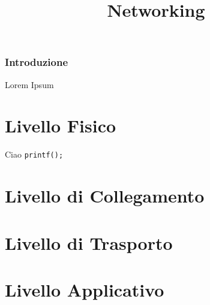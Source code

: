 \documentclass[a4paper,11pt]{paper}
\title{Networking}
\def\code#1{\texttt{#1}}
\begin{document}
\maketitle
\tableofcontents
\newpage

\section*{Introduzione}

Lorem Ipsum
\newpage

\part{Livello Fisico}

Ciao
\code{printf();}
\newpage
\part{Livello di Collegamento}
\newpage
\part{Livello di Trasporto}
\newpage
\part{Livello Applicativo}
\end{document}
